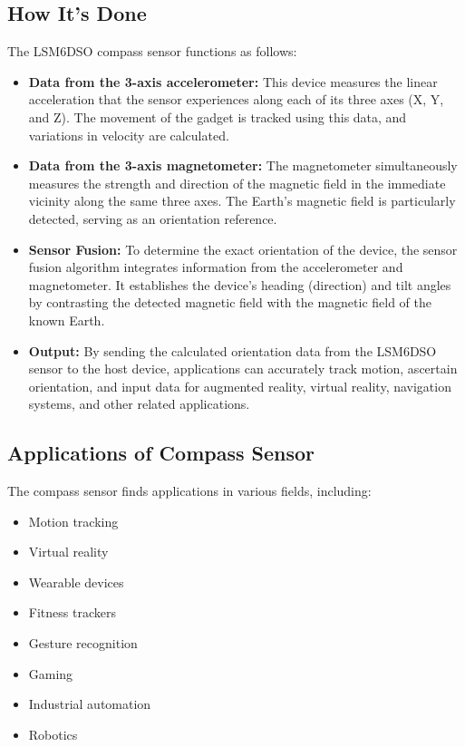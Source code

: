 \documentclass[
12pt,
oneside, 
onehalfspacing, 
nolistspacing, 
parskip, 
chapterinoneline, 
]{AASTCOMPUTER}
\begin{document}
\subsection{How It's Done}
The LSM6DSO compass sensor functions as follows:

\begin{itemize}
  \item \textbf{Data from the 3-axis accelerometer:} This device measures the linear acceleration that the sensor experiences along each of its three axes (X, Y, and Z). The movement of the gadget is tracked using this data, and variations in velocity are calculated.
  \item \textbf{Data from the 3-axis magnetometer:} The magnetometer simultaneously measures the strength and direction of the magnetic field in the immediate vicinity along the same three axes. The Earth's magnetic field is particularly detected, serving as an orientation reference.
  \item \textbf{Sensor Fusion:} To determine the exact orientation of the device, the sensor fusion algorithm integrates information from the accelerometer and magnetometer. It establishes the device's heading (direction) and tilt angles by contrasting the detected magnetic field with the magnetic field of the known Earth.
  \item \textbf{Output:} By sending the calculated orientation data from the LSM6DSO sensor to the host device, applications can accurately track motion, ascertain orientation, and input data for augmented reality, virtual reality, navigation systems, and other related applications.
\end{itemize}

\subsection{Applications of Compass Sensor}
The compass sensor finds applications in various fields, including:

\begin{itemize}
  \item Motion tracking
  \item Virtual reality
  \item Wearable devices
  \item Fitness trackers
  \item Gesture recognition
  \item Gaming
  \item Industrial automation
  \item Robotics
\end{itemize}
\end{document}
